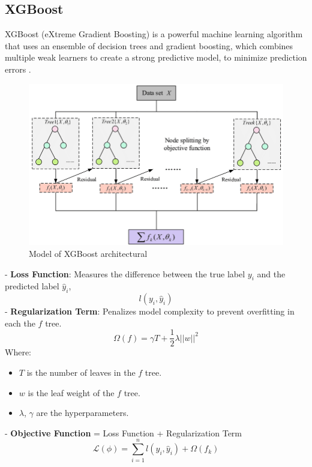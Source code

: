 \documentclass{ieeeojies}
\begin{document}
\subsection{XGBoost}
XGBoost (eXtreme Gradient Boosting) is a powerful machine learning algorithm that uses an ensemble of decision trees and gradient boosting, which combines multiple weak learners to create a strong predictive model, to minimize prediction errors \cite{b9}.\\
\begin{figure} [H]
    \centering
    \includegraphics[width=0.8\linewidth]{./image/XGBoost.png}
    \caption{Model of XGBoost architectural}
    \label{fig:10}
\end{figure}
- \textbf{Loss Function}: Measures the difference between the true label \(y_i\) and the predicted label \(\hat{y}_i\),\\
\begin{dmath*}
    l(y_i, \hat{y}_i) 
\end{dmath*}
- \textbf{Regularization Term}: Penalizes model complexity to prevent overfitting in each the \(f\) tree.\\
\begin{dmath*}
    \Omega(f) = \gamma T + \frac{1}{2} \lambda ||w||^2
\end{dmath*}
Where:
\begin{itemize}
    \item \(T\) is the number of leaves in the \(f\) tree.
    \item \(w\) is the leaf weight of the \(f\) tree.
    \item \(\lambda\), \(\gamma\)  are the  hyperparameters.
\end{itemize}
- \textbf{Objective Function} = Loss Function + Regularization Term
\begin{dmath*}
    \mathcal{L}(\phi) = \sum_{i=1}^n l(y_i, \hat{y}_i) + \Omega(f_k)
\end{dmath*}
\end{document}
